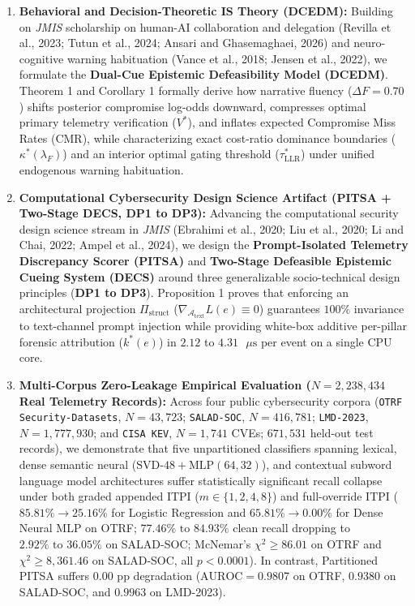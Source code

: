 \documentclass[11pt,a4paper]{article}
\begin{document}
\begin{enumerate}
  \item \textbf{Behavioral and Decision-Theoretic IS Theory (DCEDM):} Building on \textit{JMIS} scholarship on human-AI collaboration and delegation (Revilla et al., 2023; Tutun et al., 2024; Ansari and Ghasemaghaei, 2026) and neuro-cognitive warning habituation (Vance et al., 2018; Jensen et al., 2022), we formulate the \textbf{Dual-Cue Epistemic Defeasibility Model (DCEDM)}. Theorem 1 and Corollary 1 formally derive how narrative fluency ($\Delta F = 0.70$) shifts posterior compromise log-odds downward, compresses optimal primary telemetry verification ($V^*$), and inflates expected Compromise Miss Rates (CMR), while characterizing exact cost-ratio dominance boundaries ($\kappa^*(\lambda_F)$) and an interior optimal gating threshold ($\tau^*_{\text{LLR}}$) under unified endogenous warning habituation.
  \item \textbf{Computational Cybersecurity Design Science Artifact (PITSA + Two-Stage DECS, DP1 to DP3):} Advancing the computational security design science stream in \textit{JMIS} (Ebrahimi et al., 2020; Liu et al., 2020; Li and Chai, 2022; Ampel et al., 2024), we design the \textbf{Prompt-Isolated Telemetry Discrepancy Scorer (PITSA)} and \textbf{Two-Stage Defeasible Epistemic Cueing System (DECS)} around three generalizable socio-technical design principles (\textbf{DP1 to DP3}). Proposition 1 proves that enforcing an architectural projection $\Pi_{\text{struct}}$ ($\nabla_{\mathcal{A}_{\text{text}}} L(e) \equiv 0$) guarantees $100\%$ invariance to text-channel prompt injection while providing white-box additive per-pillar forensic attribution ($k^*(e)$) in $2.12$ to $4.31\text{ }\mu\text{s}$ per event on a single CPU core.
  \item \textbf{Multi-Corpus Zero-Leakage Empirical Evaluation ($N = 2,238,434$ Real Telemetry Records):} Across four public cybersecurity corpora (\texttt{OTRF Security-Datasets}, $N=43,723$; \texttt{SALAD-SOC}, $N=416,781$; \texttt{LMD-2023}, $N=1,777,930$; and \texttt{CISA KEV}, $N=1,741$ CVEs; $671,531$ held-out test records), we demonstrate that five unpartitioned classifiers spanning lexical, dense semantic neural ($\text{SVD-48}+\text{MLP}(64,32)$), and contextual subword language model architectures suffer statistically significant recall collapse under both graded appended ITPI ($m \in \{1,2,4,8\}$) and full-override ITPI ($85.81\% \to 25.16\%$ for Logistic Regression and $65.81\% \to 0.00\%$ for Dense Neural MLP on OTRF; $77.46\%\text{ to }84.93\%$ clean recall dropping to $2.92\%\text{ to }36.05\%$ on SALAD-SOC; McNemar's $\chi^2 \ge 86.01$ on OTRF and $\chi^2 \ge 8,361.46$ on SALAD-SOC, all $p < 0.0001$). In contrast, Partitioned PITSA suffers $0.00\text{ pp}$ degradation ($\text{AUROC} = 0.9807$ on OTRF, $0.9380$ on SALAD-SOC, and $0.9963$ on LMD-2023).

\end{enumerate}
\end{document}
